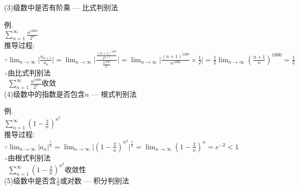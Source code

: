 (3)级数中是否有阶乘 --- 比式判别法
{\par\centering
{}}

例.\\
$\displaystyle\sum_{n=1}^{\infty}\frac{n^{1000}}{2^n}$\\[1ex]
推导过程:\\
$\because\displaystyle\lim_{n\to\infty}\Big|\frac{a_{n+1}}{a_n}\Big|=\lim_{n\to\infty}\Big|\frac{\frac{(n+1)^{1000}}{2^{n+1}}}{\frac{n^{1000}}{2^n}}\Big|=\lim_{n\to\infty}\Big|\frac{(n+1)^{1000}}{n^{1000}}\times\frac{1}{2}\Big|=\frac{1}{2}\lim_{n\to\infty}(\frac{n+1}{n})^{1000}=\frac{1}{2}$\\
$\therefore$由比式判别法\\
$\displaystyle\phantom{\therefore}\sum_{n=1}^{\infty}\frac{n^{1000}}{2^n}$收敛\\[2ex]

(4)级数中的指数是否包含$n$ --- 根式判别法
{\par\centering
{}}

例.\\
$\displaystyle\sum_{n=1}^{\infty}(1-\frac{2}{n})^{n^2}$\\[1ex]
推导过程:\\
$\because\displaystyle\lim_{n\to\infty}|a_n|^{\frac{1}{n}}=\lim_{n\to\infty}\Big|(1-\frac{2}{n})^{n^2}\Big|^{\frac{1}{n}}=\lim_{n\to\infty}(1-\frac{2}{n})^n=e^{-2}<1$\\
$\therefore$由根式判别法\\
$\phantom{\therefore}\displaystyle\sum_{n=1}^{\infty}(1-\frac{2}{n})^{n^2}$收敛性\\[2ex]

(5)级数中是否含$\displaystyle\frac{1}{n}$或对数 --- 积分判别法
{\par\centering
{}}

